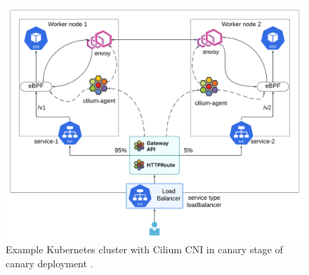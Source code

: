 \begin{figure}[H]
    \centering
    \includegraphics[width=1\columnwidth]{images/cilium_dataflow_hq.png}
    \caption{Example Kubernetes cluster with Cilium CNI in canary stage of canary deployment \cite{CiliumUseCases}.}
    \label{fig:ciliumDataflow}
\end{figure}

